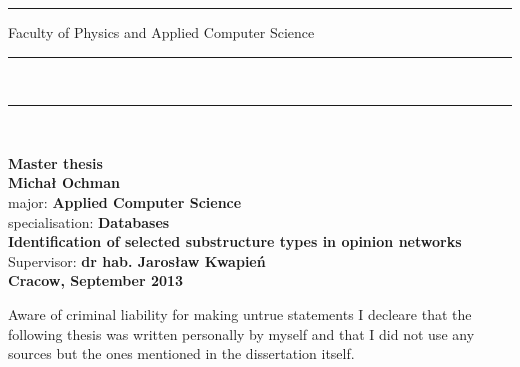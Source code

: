 \documentclass[a4paper,12pt]{article}
\begin{document}

\thispagestyle{empty}
\rule{30mm}{0pt}{
{\large \textsf{Faculty of Physics and Applied Computer Science}}\\
\rule{\textwidth}{3pt}\\
\rule[2ex]
{\textwidth}{1pt}\\
\vspace{7ex}
\begin{center}
{\LARGE \bf \textsf{Master thesis}}\\
\vspace{13ex}
{\bf \Large \textsf{Michał Ochman}}\\
\vspace{3ex}
{\small \sf major: {\bf \textsf{Applied Computer Science}}}\\
\vspace{1.5ex}
{\small \sf specialisation: {\bf \textsf{Databases}}}\\
\vspace{10ex}
{\bf \huge \textsf{Identification of selected substructure types in opinion networks}}\\
\vspace{14ex}
{\Large \sf Supervisor: {\bf \textsf{dr hab. Jarosław Kwapień}}}\\
\vspace{22ex}
{\large \bf \textsf{Cracow, September 2013}}
\end{center}

\newpage

Aware of criminal liability for making untrue statements I decleare that
the following thesis was written personally by myself and that I did not use
any sources but the ones mentioned in the dissertation itself.

}
\end{document}

